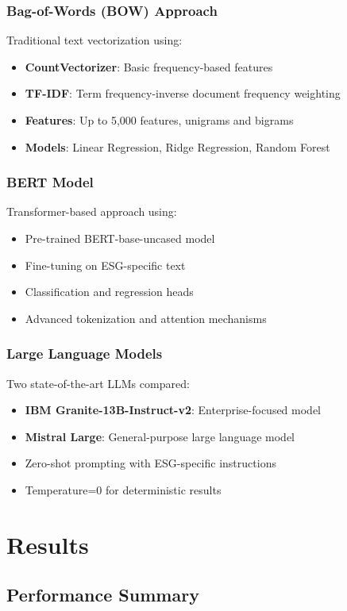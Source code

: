 \documentclass[12pt,a4paper]{article}
\begin{document}
\subsubsection{Bag-of-Words (BOW) Approach}
Traditional text vectorization using:
\begin{itemize}
    \item \textbf{CountVectorizer}: Basic frequency-based features
    \item \textbf{TF-IDF}: Term frequency-inverse document frequency weighting
    \item \textbf{Features}: Up to 5,000 features, unigrams and bigrams
    \item \textbf{Models}: Linear Regression, Ridge Regression, Random Forest
\end{itemize}

\subsubsection{BERT Model}
Transformer-based approach using:
\begin{itemize}
    \item Pre-trained BERT-base-uncased model
    \item Fine-tuning on ESG-specific text
    \item Classification and regression heads
    \item Advanced tokenization and attention mechanisms
\end{itemize}

\subsubsection{Large Language Models}
Two state-of-the-art LLMs compared:
\begin{itemize}
    \item \textbf{IBM Granite-13B-Instruct-v2}: Enterprise-focused model
    \item \textbf{Mistral Large}: General-purpose large language model
    \item Zero-shot prompting with ESG-specific instructions
    \item Temperature=0 for deterministic results
\end{itemize}

\section{Results}

\subsection{Performance Summary}
\end{document}
